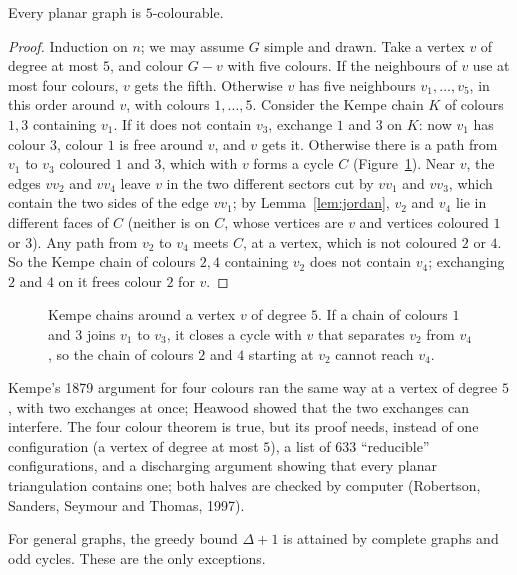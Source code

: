 \begin{theorem}[Heawood, 1890]\label{thm:fivecolour}
Every planar graph is $5$-colourable.
\end{theorem}
\begin{proof}
Induction on $n$; we may assume $G$ simple and drawn. Take a vertex $v$ of degree at most $5$, and colour $G-v$ with five colours. If the neighbours of $v$
use at most four colours, $v$ gets the fifth. Otherwise $v$ has five neighbours $v_1,\dots,v_5$, in this order around $v$, with colours $1,\dots,5$. Consider the
Kempe chain $K$ of colours $1,3$ containing $v_1$. If it does not contain $v_3$, exchange $1$ and $3$ on $K$: now $v_1$ has colour $3$, colour $1$ is free around $v$, and
$v$ gets it. Otherwise there is a path from $v_1$ to $v_3$ coloured $1$ and $3$, which with $v$ forms a cycle $C$ (Figure~\ref{fig:kempe}). Near $v$, the edges $vv_2$ and $vv_4$
leave $v$ in the two different sectors cut by $vv_1$ and $vv_3$, which contain the two sides of the edge $vv_1$; by Lemma~\ref{lem:jordan}, $v_2$ and $v_4$ lie in different
faces of $C$ (neither is on $C$, whose vertices are $v$ and vertices coloured $1$ or $3$). Any path from $v_2$ to $v_4$ meets $C$, at a vertex, which is not coloured $2$
or $4$. So the Kempe chain of colours $2,4$ containing $v_2$ does not contain $v_4$; exchanging $2$ and $4$ on it frees colour $2$ for $v$.
\end{proof}

\begin{figure}[ht]
\centering
{}
\caption{Kempe chains around a vertex $v$ of degree $5$. If a chain of colours $1$ and $3$ joins $v_1$ to $v_3$, it closes a cycle with $v$ that separates $v_2$ from $v_4$,
so the chain of colours $2$ and $4$ starting at $v_2$ cannot reach $v_4$.}
\label{fig:kempe}
\end{figure}

Kempe's 1879 argument for four colours ran the same way at a vertex of degree $5$, with two exchanges at once; Heawood showed that the two
exchanges can interfere. The four colour theorem is true, but its proof needs, instead of one configuration (a vertex of degree at most
$5$), a list of $633$ ``reducible'' configurations, and a discharging argument showing that every planar triangulation contains one; both
halves are checked by computer (Robertson, Sanders, Seymour and Thomas, 1997).

For general graphs, the greedy bound $\Delta+1$ is attained by complete graphs and odd cycles. These are the only exceptions.

